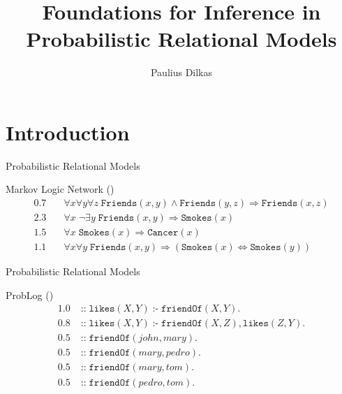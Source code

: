 \documentclass{beamer}
\author{Paulius Dilkas}
\title{Foundations for Inference in Probabilistic Relational Models}
\DeclareMathOperator{\ifff}{:-}
\DeclareMathOperator{\prob}{::}
\begin{document}
\maketitle



\section{Introduction}

\begin{frame}{Probabilistic Relational Models}
  \begin{block}{Markov Logic Network (\cite{DBLP:journals/ml/RichardsonD06})}
    \vspace*{-\baselineskip}\setlength\belowdisplayshortskip{0pt}
    \begin{align*}
      0.7 &\quad \forall x \forall y \forall z \; \mathtt{Friends}(x, y) \land \mathtt{Friends}(y, z) \Rightarrow \mathtt{Friends}(x, z) \\
      2.3 &\quad \forall x \; \lnot\exists y \; \mathtt{Friends}(x, y) \Rightarrow \mathtt{Smokes}(x) \\
      1.5 &\quad \forall x \; \mathtt{Smokes}(x) \Rightarrow \mathtt{Cancer}(x) \\
      1.1 &\quad \forall x \forall y \; \mathtt{Friends}(x, y) \Rightarrow (\mathtt{Smokes}(x) \Leftrightarrow \mathtt{Smokes}(y))
    \end{align*}
  \end{block}
\end{frame}

\begin{frame}{Probabilistic Relational Models}
  \begin{block}{ProbLog (\cite{DBLP:conf/ijcai/RaedtKT07})}
    \vspace*{-\baselineskip}\setlength\belowdisplayshortskip{0pt}
    \begin{align*}
      1.0 &\prob \mathtt{likes}(X, Y) \ifff \mathtt{friendOf}(X, Y). \\
      0.8 &\prob \mathtt{likes}(X, Y) \ifff \mathtt{friendOf}(X, Z), \mathtt{likes}(Z, Y). \\
      0.5 &\prob \mathtt{friendOf}(\mathit{john}, \mathit{mary}). \\
      0.5 &\prob \mathtt{friendOf}(\mathit{mary}, \mathit{pedro}). \\
      0.5 &\prob \mathtt{friendOf}(\mathit{mary}, \mathit{tom}). \\
      0.5 &\prob \mathtt{friendOf}(\mathit{pedro}, \mathit{tom}).
    \end{align*}
  \end{block}
\end{frame}
\end{document}

